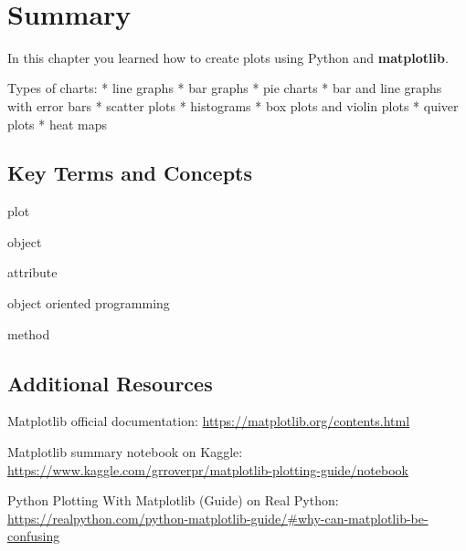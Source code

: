 \documentclass{book}
\begin{document}
    \begin{center}
    \end{center}
    { \hspace*{\fill} \\}
    

    
        \section{Summary}\label{summary}
    




    
        In this chapter you learned how to create plots using Python and
\textbf{matplotlib}.
    




    
        Types of charts: * line graphs * bar graphs * pie charts * bar and line
graphs with error bars * scatter plots * histograms * box plots and
violin plots * quiver plots * heat maps
    




    
        \subsection{Key Terms and Concepts}\label{key-terms-and-concepts}

plot

object

attribute

object oriented programming

method
    




    
        \subsection{Additional Resources}\label{additional-resources}
    




    
        Matplotlib official documentation:
\url{https://matplotlib.org/contents.html}

Matplotlib summary notebook on Kaggle:
\url{https://www.kaggle.com/grroverpr/matplotlib-plotting-guide/notebook}

Python Plotting With Matplotlib (Guide) on Real Python:
\url{https://realpython.com/python-matplotlib-guide/\#why-can-matplotlib-be-confusing}
\end{document}
